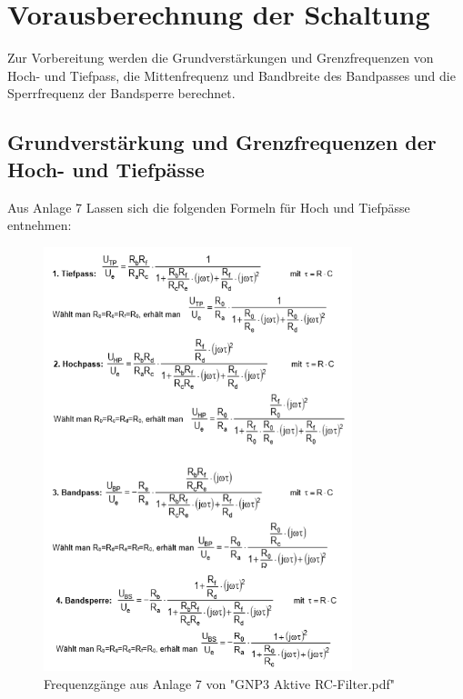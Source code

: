 \section{ Vorausberechnung der Schaltung}

Zur Vorbereitung werden die Grundverstärkungen und Grenzfrequenzen von Hoch- und Tiefpass, die Mittenfrequenz und Bandbreite des Bandpasses und die Sperrfrequenz der Bandsperre berechnet.

\subsection{Grundverstärkung und Grenzfrequenzen der Hoch- und Tiefpässe}
Aus Anlage 7 Lassen sich die folgenden Formeln für Hoch und Tiefpässe entnehmen:

\begin{figure}[H]
    \begin{center}
        \includegraphics[width=0.8\textwidth]{img/grundamp.png}
        \caption{Frequenzgänge aus Anlage 7 von "GNP3 Aktive RC-Filter.pdf"} %
        \label{fig:V1_filter}
    \end{center}
\end{figure}



